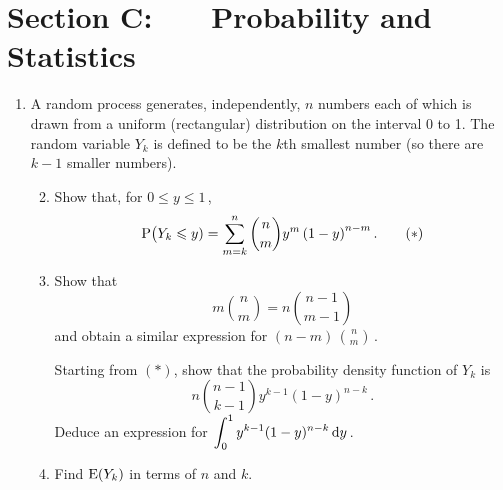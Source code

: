 \documentclass[a4, 11pt]{report}
\newlength{\qspace}
\newcounter{qnumber}
\newenvironment{question}%
 {\vspace{\qspace}
  \begin{enumerate}[\bfseries 1\quad][10]%
    \setcounter{enumi}{\value{qnumber}}%
    \item%
 }
{
  \end{enumerate}
  \filbreak
  \stepcounter{qnumber}
 }
\newenvironment{questionparts}[1][1]%
 {
  \begin{enumerate}[\bfseries (i)]%
    \setcounter{enumii}{#1}
    \addtocounter{enumii}{-1}
    \setlength{\itemsep}{3mm}
    \setlength{\parskip}{8pt}
 }
 {
  \end{enumerate}
 }
\def\d{{\rm d}}
\def\E{{\rm E}}
\def\le{\leqslant}
\begin{document}
\newpage
\section*{Section C: \ \ \ Probability and Statistics}

\begin{question}
A random process generates, independently, $n$
numbers each of which is drawn from a uniform (rectangular) 
distribution on  the interval 0 to 1. 
The random variable $Y_k$
is defined to be   the $k$th smallest number (so there
are $k-1$ smaller numbers).

\begin{questionparts}
\item Show  that, for $0\le y\le1\,$, 
\[
{\rm P}\big(Y_k\le y) =\sum^{n}_{m=k}\binom{n}{m}y^{m}\left(1-y\right)^{n-m}
.
\tag{$*$}
\] 
\item
Show that 
\[
m\binom n m = n \binom {n-1}{m-1}
\]
and obtain a similar expression for 
$\displaystyle (n-m) \, \binom n m\,$.

Starting from $(*)$,
show that
the  
probability density function of $Y_k$ is
\[
 n\binom{ n-1}{k-1}
y^{k-1}\left(1-y\right)^{ n-k}
\,.            
\]
Deduce an expression for
$
\displaystyle
\int_0^1 y^{k-1}(1-y)^{n-k} \, \d y
\,$.
\item
Find $\E(Y_k) $ in terms of $n$ and $k$.
\end{questionparts}
\end{question}
 
\end{document}
